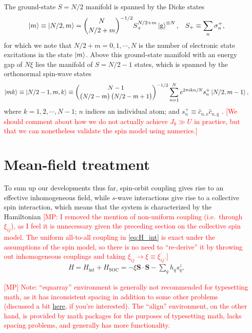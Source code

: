 \documentclass[aps,notitlepage,nofootinbib,11pt]{revtex4-1}
\renewcommand{\t}{\text} %
\newcommand{\p}[1]{\left(#1\right)} %
\renewcommand{\v}{\bm} %
\renewcommand{\c}{\cdot} %
\newcommand{\g}{\text{g}} %
\newcommand{\e}{\text{e}}
\newcommand{\1}{\hat{\mathds{1}}}
\newcommand{\note}[1]{\textcolor{red}{#1}}
\begin{document}
The ground-state $S=N/2$ manifold is spanned by the Dicke states
\begin{align}
  \ket{m} \equiv \ket{N/2,m}
  = {N \choose N/2+m}^{-1/2} S_+^{N/2+m} \ket{\g}^{\otimes N},
  &&
  S_+ \equiv \sum_n \sigma_n^+,
\end{align}
for which we note that $N/2+m=0,1,\cdots,N$ is the number of
electronic state excitations in the state $\ket{m}$.  Above this
ground-state manifold with an energy gap of $N\xi$ lies the manifold
of $S=N/2-1$ states, which is spanned by the orthonormal spin-wave
states
\begin{align}
  \ket{mk}
  \equiv \ket{N/2-1,m,k}
  \equiv {N-1 \choose \p{N/2-m}\p{N/2-m+1}}^{-1/2}
  \sum_{n=1}^N e^{2\pi ikn/N} s_n^+ \ket{N/2,m-1},
\end{align}
where $k=1,2,\cdots,N-1$; $n$ indices an individual atom; and
$s_n^+\equiv\hat c_{n,\e}\hat c_{n,\g}$
\cite{swallows2011suppression}.  \note{[We should comment about how we
  do not actually achieve $J_0\gg U$ in practice, but that we can
  nonetheless validate the spin model using numerics.]}


\section{Mean-field treatment}

To sum up our developments thus far, spin-orbit coupling gives rise to
an effective inhomogeneous field, while $s$-wave interactions give
rise to a collective spin interaction, which means that the system is
characterized by the Hamiltonian \note{[MP: I removed the mention of
  non-uniform coupling (i.e.~through $\xi_{ij}$), as I feel it is
  unnecessary given the preceding section on the collective spin
  model.  The uniform all-to-all coupling in \eqref{eq:H_int} is exact
  under the assumptions of the spin model, so there is no need to
  ``re-derive'' it by throwing out inhomogeneous couplings and taking
  $\xi_{ij}\to\xi\equiv\overline{\xi_{ij}}$.]}
\begin{align}
  H = H_{\t{int}} + H_{\t{SOC}} = -\xi\v S\c\v S - \sum_q h_q s_q^z,
  \label{eq:H_full}
\end{align}

\note{[MP] Note: ``eqnarray'' environment is generally not recommended
  for typesetting math, as it has inconsistent spacing in addition to
  some other problems (discussed a bit
  \href{http://www.tug.org/pracjourn/2006-4/madsen/madsen.pdf}{here},
  if you're interested).  The ``align'' environment, on the other
  hand, is provided by math packages for the purposes of typesetting
  math, lacks spacing problems, and generally has more functionality.}
\end{document}
